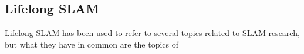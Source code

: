 \subsection{Lifelong SLAM}

Lifelong SLAM has been used to refer to several topics related to SLAM research, but what they have in common are the topics of 